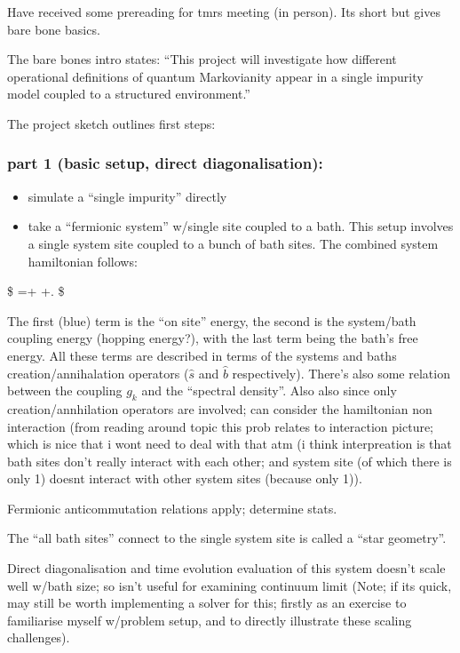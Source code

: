 \documentclass[
  letterpaper,
  DIV=11,
  numbers=noendperiod]{scrartcl}
\providecommand{\tightlist}{%
  \setlength{\itemsep}{0pt}\setlength{\parskip}{0pt}}
\begin{document}
Have received some prereading for tmrs meeting (in person). Its short
but gives bare bone basics.

The bare bones intro states: ``This project will investigate how
different operational definitions of quantum Markovianity appear in a
single impurity model coupled to a structured environment.''

The project sketch outlines first steps:

\subsubsection{part 1 (basic setup, direct
diagonalisation):}\label{part-1-basic-setup-direct-diagonalisation}

\begin{itemize}
\tightlist
\item
  simulate a ``single impurity'' directly
\item
  take a ``fermionic system'' w/single site coupled to a bath. This
  setup involves a single system site coupled to a bunch of bath sites.
  The combined system hamiltonian follows:
\end{itemize}

\$ =+
+. \$

The first (blue) term is the ``on site'' energy, the second is the
system/bath coupling energy (hopping energy?), with the last term being
the bath's free energy. All these terms are described in terms of the
systems and baths creation/annihalation operators (\(\hat{s}\) and
\(\hat{b}\) respectively). There's also some relation between the
coupling \(g_{k}\) and the ``spectral density''. Also also since only
creation/annhilation operators are involved; can consider the
hamiltonian non interaction (from reading around topic this prob relates
to interaction picture; which is nice that i wont need to deal with that
atm (i think interpreation is that bath sites don't really interact with
each other; and system site (of which there is only 1) doesnt interact
with other system sites (because only 1)).

Fermionic anticommutation relations apply; determine stats.

The ``all bath sites'' connect to the single system site is called a
``star geometry''.

Direct diagonalisation and time evolution evaluation of this system
doesn't scale well w/bath size; so isn't useful for examining continuum
limit (Note; if its quick, may still be worth implementing a solver for
this; firstly as an exercise to familiarise myself w/problem setup, and
to directly illustrate these scaling challenges).
\end{document}
